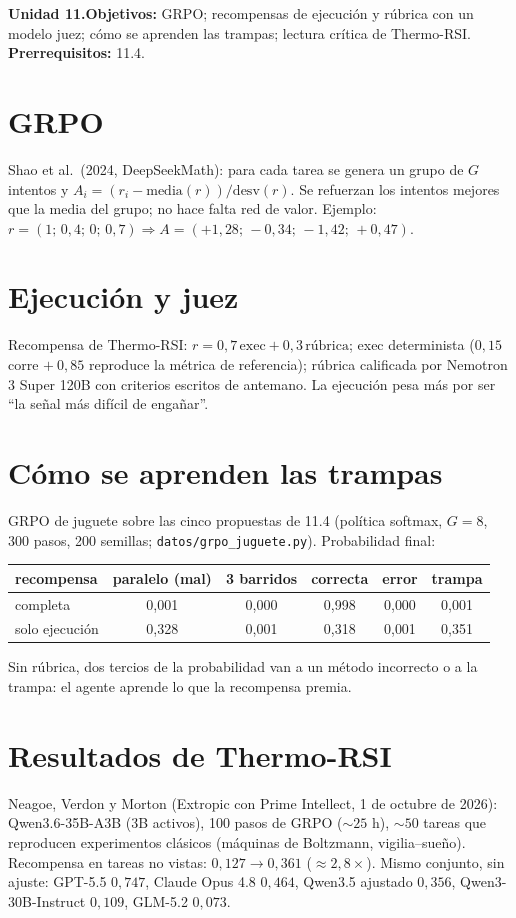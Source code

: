 \documentclass[11pt,a4paper]{article}
\begin{document}

\noindent\textbf{Unidad 11.}\quad\textbf{Objetivos:} GRPO; recompensas de ejecución y rúbrica con un modelo juez; cómo se aprenden las trampas; lectura crítica de
Thermo-RSI.
\textbf{Prerrequisitos:} 11.4.

\section{GRPO}
Shao et al.\ (2024, DeepSeekMath): para cada tarea se genera un grupo de $G$ intentos y $A_i=(r_i-\mathrm{media}(r))/\mathrm{desv}(r)$. Se refuerzan los intentos mejores
que la media del grupo; no hace falta red de valor. Ejemplo: $r=(1;\,0{,}4;\,0;\,0{,}7)\Rightarrow A=(+1{,}28;\,-0{,}34;\,-1{,}42;\,+0{,}47)$.

\section{Ejecución y juez \evP}
Recompensa de Thermo-RSI: $r=0{,}7\,\text{exec}+0{,}3\,\text{rúbrica}$; exec determinista ($0{,}15$ corre $+\ 0{,}85$ reproduce la métrica de referencia); rúbrica
calificada por Nemotron 3 Super 120B con criterios escritos de antemano. La ejecución pesa más por ser ``la señal más difícil de engañar''.

\section{Cómo se aprenden las trampas \evS}
GRPO de juguete sobre las cinco propuestas de 11.4 (política softmax, $G=8$, 300 pasos, 200 semillas; \texttt{datos/grpo\_juguete.py}). Probabilidad final:
\begin{center}\small\begin{tabular}{lccccc}\toprule
recompensa & paralelo (mal) & 3 barridos & correcta & error & trampa\\\midrule
completa & 0{,}001 & 0{,}000 & 0{,}998 & 0{,}000 & 0{,}001\\
solo ejecución & 0{,}328 & 0{,}001 & 0{,}318 & 0{,}001 & 0{,}351\\\bottomrule
\end{tabular}\end{center}
Sin rúbrica, dos tercios de la probabilidad van a un método incorrecto o a la trampa: el agente aprende lo que la recompensa premia.

\section{Resultados de Thermo-RSI \evP}
Neagoe, Verdon y Morton (Extropic con Prime Intellect, 1 de octubre de 2026): Qwen3.6-35B-A3B (3B activos), 100 pasos de GRPO ($\sim25$ h), $\sim50$ tareas que reproducen
experimentos clásicos (máquinas de Boltzmann, vigilia--sueño). Recompensa en tareas no vistas: $0{,}127\to0{,}361$ ($\approx2{,}8\times$). Mismo conjunto, sin ajuste:
GPT-5.5 $0{,}747$, Claude Opus 4.8 $0{,}464$, Qwen3.5 ajustado $0{,}356$, Qwen3-30B-Instruct $0{,}109$, GLM-5.2 $0{,}073$.
\end{document}
